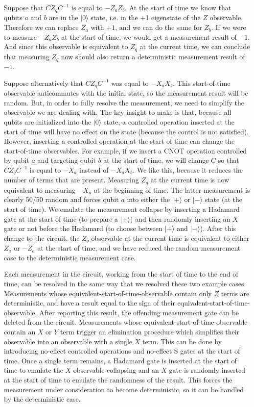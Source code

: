 \documentclass[onecolumn,unpublished]{quantumarticle}
\theoremstyle{definition}
\theoremstyle{definition}
\theoremstyle{definition}
\begin{document}
Suppose that $C Z_q C^{-1}$ is equal to $-Z_a Z_b$.
At the start of time we know that qubits $a$ and $b$ are in the $|0\rangle$ state, i.e. in the +1 eigenstate of the $Z$ observable.
Therefore we can replace $Z_a$ with $+1$, and we can do the same for $Z_b$.
If we were to measure $-Z_a Z_b$ at the start of time, we would get a measurement result of $-1$.
And since this observable is equivalent to $Z_q$ at the current time, we can conclude that measuring $Z_q$ now should also return a deterministic measurement result of $-1$.

Suppose alternatively that $C Z_q C^{-1}$ was equal to $-X_a X_b$.
This start-of-time  observable anticommutes with the initial state, so the measurement result will be random.
But, in order to fully resolve the measurement, we need to simplify the observable we are dealing with.
The key insight to make is that, because all qubits are initialized into the $|0\rangle$ state, a controlled operation inserted at the start of time will have no effect on the state (because the control is not satisfied).
However, inserting a controlled operation at the start of time can change the start-of-time observables.
For example, if we insert a CNOT operation controlled by qubit $a$ and targeting qubit $b$ at the start of time, we will change $C$ so that $C Z_q C^{-1}$ is equal to $-X_a$ instead of $-X_a X_b$.
We like this, because it reduces the number of terms that are present.
Measuring $Z_q$ at the current time is now equivalent to measuring $-X_a$ at the beginning of time.
The latter measurement is clearly 50/50 random and forces qubit $a$ into either the $|+\rangle$ or $|-\rangle$ state (at the start of time).
We emulate the measurement collapse by inserting a Hadamard gate at the start of time (to prepare a $|+\rangle$) and then randomly inserting an $X$ gate or not before the Hadamard (to choose between $|+\rangle$ and $|-\rangle$).
After this change to the circuit, the $Z_q$ observable at the current time is equivalent to either $Z_a$ or $-Z_a$ at the start of time, and we have reduced the random measurement case to the deterministic measurement case.

Each measurement in the circuit, working from the start of time to the end of time, can be resolved in the same way that we resolved these two example cases.
Measurements whose equivalent-start-of-time-observable contain only $Z$ terms are deterministic, and have a result equal to the sign of their equivalent-start-of-time-observable.
After reporting this result, the offending measurement gate can be deleted from the circuit.
Measurements whose equivalent-start-of-time-observable contain an $X$ or $Y$ term trigger an elimination procedure which simplifies their observable into an observable with a single $X$ term.
This can be done by introducing no-effect controlled operations and no-effect S gates at the start of time.
Once a single term remains, a Hadamard gate is inserted at the start of time to emulate the $X$ observable collapsing and an $X$ gate is randomly inserted at the start of time to emulate the randomness of the result.
This forces the measurement under consideration to become deterministic, so it can be handled by the deterministic case.
\end{document}
